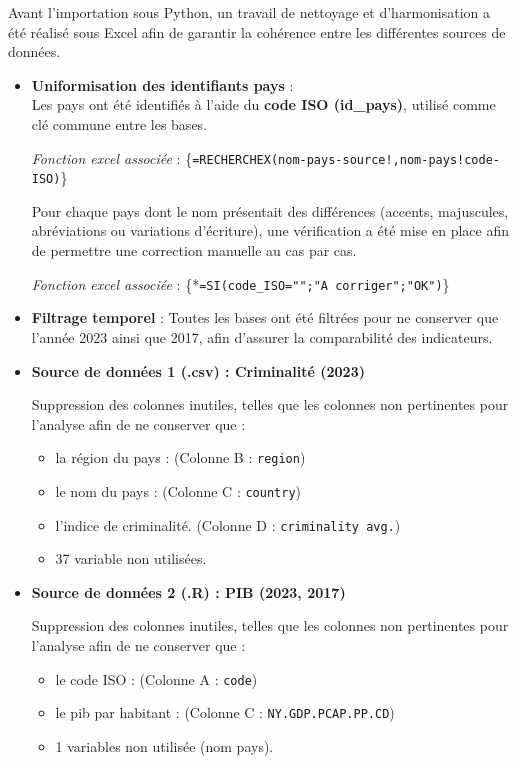 \documentclass[mstat,12pt]{unswthesis}
\begin{document}
Avant l'importation sous Python, un travail de nettoyage et
d'harmonisation a été réalisé sous Excel afin de garantir la cohérence
entre les différentes sources de données.

\bigskip

\begin{itemize}
\item
  \textbf{Uniformisation des identifiants pays} :\\
  Les pays ont été identifiés à l'aide du \textbf{code ISO (id\_pays)},
  utilisé comme clé commune entre les bases.

  \emph{Fonction excel associée} :
  \{\texttt{=RECHERCHEX(nom-pays-source!,nom-pays!code-ISO)}\}

  Pour chaque pays dont le nom présentait des différences (accents,
  majuscules, abréviations ou variations d'écriture), une vérification a
  été mise en place afin de permettre une correction manuelle au cas par
  cas.

  \emph{Fonction excel associée} :
  \{*\texttt{=SI(code\_ISO="";"A\ corriger";"OK")}\}
\item
  \textbf{Filtrage temporel} : Toutes les bases ont été filtrées pour ne
  conserver que l'année 2023 ainsi que 2017, afin d'assurer la
  comparabilité des indicateurs.
\end{itemize}

\medskip

\begin{itemize}
\item
  \textbf{Source de données 1 (.csv) : Criminalité (2023)}

  Suppression des colonnes inutiles, telles que les colonnes non
  pertinentes pour l'analyse afin de ne conserver que :

  \begin{itemize}
  \item
    la région du pays : (Colonne B : \texttt{region})
  \item
    le nom du pays : (Colonne C : \texttt{country})
  \item
    l'indice de criminalité. (Colonne D : \texttt{criminality\ avg.})
  \item
    37 variable non utilisées.
  \end{itemize}
\end{itemize}

\medskip

\begin{itemize}
\item
  \textbf{Source de données 2 (.R) : PIB (2023, 2017)}

  Suppression des colonnes inutiles, telles que les colonnes non
  pertinentes pour l'analyse afin de ne conserver que :

  \begin{itemize}
  \item
    le code ISO : (Colonne A : \texttt{code})
  \item
    le pib par habitant : (Colonne C : \texttt{NY.GDP.PCAP.PP.CD})
  \item
    1 variables non utilisée (nom pays).
  \end{itemize}
\end{itemize}
\end{document}
